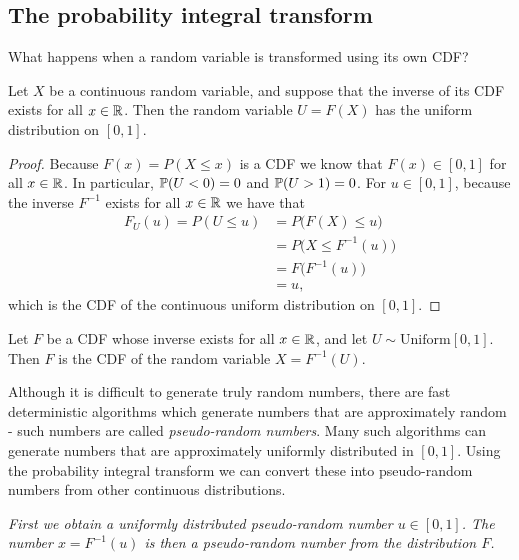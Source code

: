 \subsection{The probability integral transform}

What happens when a random variable is transformed using its own CDF? 

\begin{theorem}%
Let $X$ be a continuous random variable, and suppose that the inverse of its CDF exists for all $x\in\mathbb{R}$. Then the random variable $U=F(X)$ has the uniform distribution on $[0,1]$.
\end{theorem}

\begin{proof}
Because $F(x)=P(X\leq x)$ is a CDF we know that $F(x)\in [0,1]$ for all $x\in\mathbb{R}$. In particular, $\mathbb{P}(U<0)=0$ and $\mathbb{P}(U>1)=0$. For $u\in[0,1]$, because the inverse $F^{-1}$ exists for all $x\in\mathbb{R}$ we have that
\begin{align*}
F_U(u) = P(U\leq u) 
	& = P\big(F(X)\leq u\big) \\
	& = P\big(X\leq F^{-1}(u)\big) \\
	& = F\big(F^{-1}(u)\big) \\
	& = u,
\end{align*}
which is the CDF of the continuous uniform distribution on $[0,1]$.
\end{proof}

\begin{corollary}
Let $F$ be a CDF whose inverse exists for all $x\in\mathbb{R}$, and let $U\sim\text{Uniform}[0,1]$. Then $F$ is the CDF of the random variable $X = F^{-1}(U)$.
\end{corollary}

Although it is difficult to generate truly random numbers, there are fast deterministic algorithms which generate numbers that are approximately random - such numbers are called \emph{pseudo-random numbers}. Many such algorithms can generate numbers that are approximately uniformly distributed in $[0,1]$. Using the probability integral transform we can convert these into pseudo-random numbers from other continuous distributions.

\ben
\it First we obtain a uniformly distributed pseudo-random number $u\in [0,1]$.
\it The number $x = F^{-1}(u)$ is then a pseudo-random number from the distribution $F$.
\een

